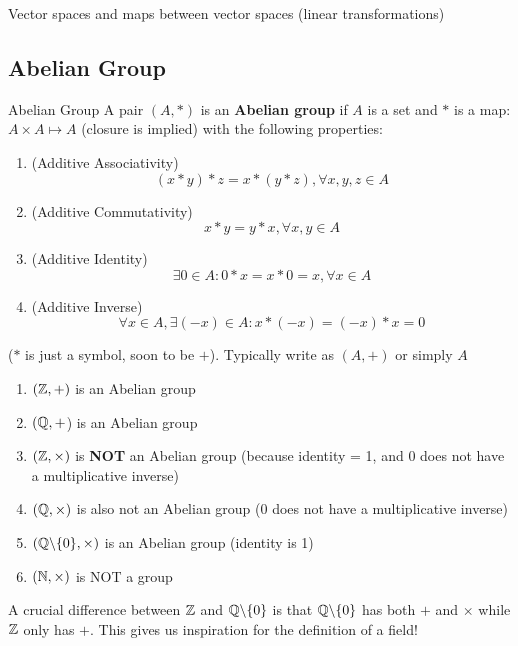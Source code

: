 \begin{goal}
    Vector spaces and maps between vector spaces (linear transformations)
\end{goal}
\subsection{Abelian Group}
\begin{definition} {Abelian Group}
    A pair \((A, *)\) is an \textbf{Abelian group} if \(A\) is a set and \(*\) is a map: \(A \times A \mapsto A\) (closure is implied) with the following properties:
    \begin{enumerate}
        \item (Additive Associativity) \[
                  (x * y) * z = x * (y * z), \forall x, y, z \in A
              \]
        \item (Additive Commutativity) \[
                  x * y = y * x, \forall x, y \in A
              \]
        \item (Additive Identity) \[
                  \exists 0 \in A: 0 * x = x * 0 = x, \forall x \in A
              \]
        \item (Additive Inverse) \[
                  \forall x \in A, \exists (-x) \in A: x * (-x) = (-x) * x = 0
              \]
    \end{enumerate}
\end{definition}

\begin{remark}
    (\(*\) is just a symbol, soon to be \(+\)). Typically write as \((A, +)\) or simply \(A\)
\end{remark}

\begin{example}
    \begin{enumerate}
        \item \((\mathbb{Z}, +)\) is an Abelian group
        \item \((\mathbb{Q}, +\)) is an Abelian group
        \item \((\mathbb{Z}, \times)\) is \textbf{NOT} an Abelian group (because identity = 1, and 0 does not have a multiplicative inverse)
        \item \((\mathbb{Q}, \times)\) is also not an Abelian group (0 does not have a multiplicative inverse)
        \item \((\mathbb{Q}\backslash\{0\}, \times)\) is an Abelian group (identity is 1)
        \item \((\mathbb{N}, \times)\) is NOT a group
    \end{enumerate}
\end{example}
\begin{remark}
    A crucial difference between \(\mathbb{Z}\) and \(\mathbb{Q}\backslash\{0\}\) is that \(\mathbb{Q}\backslash\{0\}\) has both \(+\) and \(\times\) while \(\mathbb{Z}\) only has \(+\). This gives us inspiration for the definition of a field!
\end{remark}

